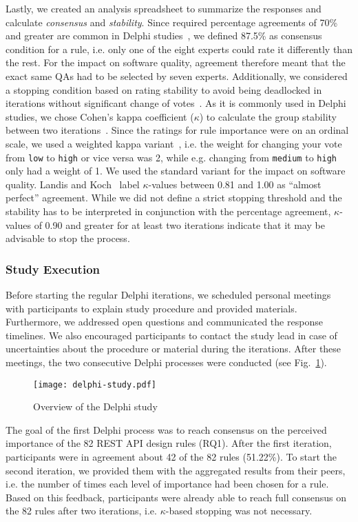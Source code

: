 \documentclass[runningheads]{llncs}
\begin{document}
Lastly, we created an analysis spreadsheet to summarize the responses and calculate \textit{consensus} and \textit{stability}.
Since required percentage agreements of 70\% and greater are common in Delphi studies~\cite{Vernon2009}, we defined 87.5\% as consensus condition for a rule, i.e. only one of the eight experts could rate it differently than the rest.
For the impact on software quality, agreement therefore meant that the exact same QAs had to be selected by seven experts.
Additionally, we considered a stopping condition based on rating stability to avoid being deadlocked in iterations without significant change of votes~\cite{Holey2007}.
As it is commonly used in Delphi studies, we chose Cohen's kappa coefficient ($\kappa$) to calculate the group stability between two iterations~\cite{Landis1977}.
Since the ratings for rule importance were on an ordinal scale, we used a weighted kappa variant~\cite{Holey2007}, i.e. the weight for changing your vote from \texttt{low} to \texttt{high} or vice versa was 2, while e.g. changing from \texttt{medium} to \texttt{high} only had a weight of 1.
We used the standard variant for the impact on software quality.
Landis and Koch~\cite{Landis1977} label $\kappa$-values between 0.81 and 1.00 as \enquote{almost perfect} agreement.
While we did not define a strict stopping threshold and the stability has to be interpreted in conjunction with the percentage agreement, $\kappa$-values of 0.90 and greater for at least two iterations indicate that it may be advisable to stop the process.

\subsubsection{Study Execution}
Before starting the regular Delphi iterations, we scheduled personal meetings with participants to explain study procedure and provided materials.
Furthermore, we addressed open questions and communicated the response timelines.
We also encouraged participants to contact the study lead in case of uncertainties about the procedure or material during the iterations.
After these meetings, the two consecutive Delphi processes were conducted (see Fig.~\ref{fig:delphi-study}).

\begin{figure}[H]
    \centering
    \texttt{[image: delphi-study.pdf]}
    \caption{Overview of the Delphi study}
    \label{fig:delphi-study}
\end{figure}

The goal of the first Delphi process was to reach consensus on the perceived importance of the 82 REST API design rules (RQ1).
After the first iteration, participants were in agreement about 42 of the 82 rules (51.22\%). To start the second iteration, we provided them with the aggregated results from their peers, i.e. the number of times each level of importance had been chosen for a rule.
Based on this feedback, participants were already able to reach full consensus on the 82 rules after two iterations, i.e. $\kappa$-based stopping was not necessary.
\end{document}
